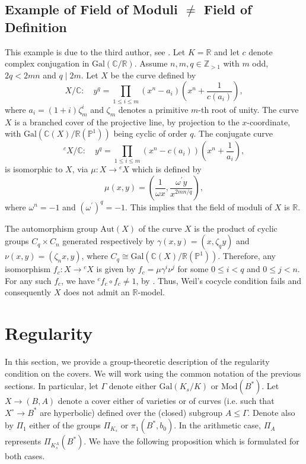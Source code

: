 \documentclass[10pt]{amsart}
\theoremstyle{definition}
\newcommand{\Z}{\mathbb{Z}}
\newcommand{\Gal}{{ \mathrm{Gal}}}
\begin{document}
\subsection{Example of Field of Moduli $\neq$ Field of Definition}\label{exm:field of moduli vs field of definition}

This example is due to the third author, see \cite{Kont-Bord}. Let $K=\mathbb R$ and let $c$ denote complex conjugation in $\Gal(\mathbb C/ \mathbb R)$. Assume $n,m,q\in \Z_{>1}$ with $m$ odd, $2q<2mn$ and $q\mid 2m$. Let $X$ be the curve defined by
\[
X/\mathbb{C}\colon \quad y^q = \prod\limits_{1\leq i \leq m} \left(x^n-a_i\right)\left(x^n+\frac{1}{c(a_i)}\right),
\]
where $a_i = (1+i)\zeta_m^i$ and $\zeta_m$ denotes a primitive $m$-th root of unity. The curve $X$ is a branched cover of the projective line, by projection to the $x$-coordinate, with $\Gal(\mathbb{C}(X)/\mathbb{R}(\mathbb{P}^1))$ being cyclic of order $q$. The conjugate curve 
\[
{^c \! X}/\mathbb{C}\colon \quad y^q = \prod\limits_{1\leq i \leq m} \left(x^n-c(a_i)\right)\left(x^n+\frac{1}{a_i}\right),
\]
is isomorphic to $X$, via $\mu : X\rightarrow {^c \! X}$ which is defined by
\[
\mu (x,y) = \left(\frac{1}{\omega x}, \frac{\omega^\prime y}{x^{2mn/q}}\right),
\]
where $\omega^n = -1$ and $(\omega^\prime)^q = -1$. This implies that the field of moduli of $X$ is $\mathbb{R}$. 

The automorphism group $\mathrm{Aut}(X)$ of the curve $X$ is the product of cyclic groups $C_q\times C_n$ generated respectively by $\gamma(x,y) = (x,\zeta_q y)$ and $\nu(x,y)=(\zeta_nx,y)$, where $C_q \cong \Gal(\mathbb{C}(X)/\mathbb{R}(\mathbb{P}^1))$. 
Therefore, any isomorphism $f_c \colon X \rightarrow {^c \! X}$ is given by $f_c = \mu \gamma^i \nu^j$ for some $0 \leq i < q$ and $0\leq j < n$. For any such $f_c$, we have ${^c \!f}_c \circ f_c \neq 1$, by \cite[Prop. 5.1]{Kont-Bord}. Thus, Weil's cocycle condition fails and consequently $X$ does not admit an $\mathbb{R}$-model.

\section{Regularity}\label{sec:regularity}
In this section, we provide a group-theoretic description of the regularity condition on the covers. We will work using the common notation of the previous sections. In particular, let $\mathfrak{\Gamma}$ denote either $\Gal(K_s/K)$ or $\mathrm{Mod}(B^*)$. 
Let $X\rightarrow (B,A)$ denote a cover either of varieties or of curves (i.e. such that $X^\circ \rightarrow B^*$ are hyperbolic) defined over the (closed) subgroup $A \leq \mathfrak{\Gamma}$. Denote also by $\Pi_1$ either of the groups $\Pi_{K_s}$ or $\pi_1(B^*,b_0)$. In the arithmetic case, $\Pi_A$ represents $\Pi_{K_s^A}(B^*)$. We have the following proposition which is formulated for both cases.
\end{document}
